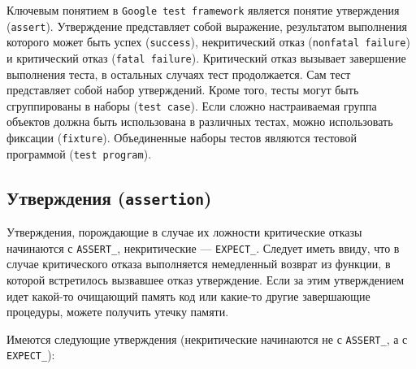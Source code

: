 \documentclass[12pt, twoside]{report}
\begin{document}
Ключевым понятием в \texttt{Google test framework} является понятие утверждения (\texttt{assert}). Утверждение представляет собой выражение, результатом выполнения 
которого может быть успех (\texttt{success}), некритический отказ (\texttt{nonfatal failure}) и критический отказ (\texttt{fatal failure}). Критический отказ вызывает 
завершение выполнения теста, в остальных случаях тест продолжается. Сам тест представляет собой набор утверждений. Кроме того, тесты могут быть сгруппированы в 
наборы (\texttt{test case}). Если сложно настраиваемая группа объектов должна быть использована в различных тестах, можно использовать фиксации 
(\texttt{fixture}). Объединенные наборы тестов являются тестовой программой (\texttt{test program}).

\subsection*{Утверждения (\texttt{assertion})}

Утверждения, порождающие в случае их ложности критические отказы начинаются с \texttt{ASSERT\_}, некритические — \texttt{EXPECT\_}. Следует иметь ввиду, что в случае 
критического отказа выполняется немедленный возврат из функции, в которой встретилось вызвавшее отказ утверждение. Если за этим утверждением идет какой-то 
очищающий память код или какие-то другие завершающие процедуры, можете получить утечку памяти.

Имеются следующие утверждения (некритические начинаются не с \texttt{ASSERT\_}, а с \texttt{EXPECT\_}):
\end{document}
